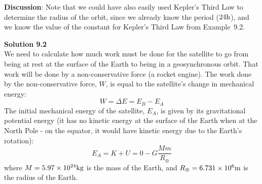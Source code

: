 \begin{framed}
\textbf{Discussion}: Note that we could have also easily used Kepler's Third Law to determine the radius of the orbit, since we already know the period ($24 {\rm h}$), and we know the value of the constant for Kepler's Third Law from Example~9.2.
\end{framed}

\begin{framed}
\textbf{Solution 9.2}\\
We need to calculate how much work must be done for the satellite to go from being at rest at the surface of the Earth to being in a geosynchronous orbit. That work will be done by a non-conservative force (a rocket engine). The work done by the non-conservative force, $W$, is equal to the satellite's change in mechanical energy:
\begin{equation}
W = \Delta E = E_B -E_A
\end{equation}
The initial mechanical energy of the satellite, $E_A$, is given by its gravitational potential energy (it has no kinetic energy at the surface of the Earth when at the North Pole - on the equator, it would have kinetic energy due to the Earth's rotation):
\begin{equation}
E_A = K + U = 0 - G\frac{Mm}{R_\oplus}
\end{equation}
where $M=5.97\times 10^{24} {\rm kg}$ is the mass of the Earth, and $R_\oplus=6.731\times 10^{6} {\rm m}$ is the radius of the Earth.


\end{framed}
